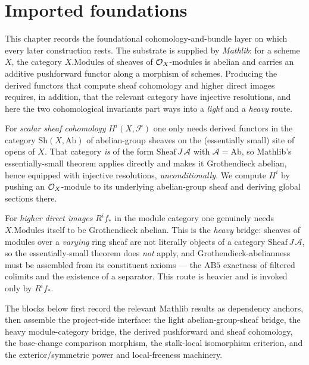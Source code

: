 \section{Imported foundations}


This chapter records the foundational cohomology-and-bundle layer on which every
later construction rests.  The substrate is supplied by \emph{Mathlib}: for a
scheme \(X\), the category \(X.\mathrm{Modules}\) of sheaves of
\(\mathcal{O}_X\)-modules is abelian and carries an additive pushforward functor along a
morphism of schemes.  Producing the derived functors that compute sheaf
cohomology and higher direct images requires, in addition, that the relevant
category have injective resolutions, and here the two cohomological invariants
part ways into a \emph{light} and a \emph{heavy} route.

For \emph{scalar sheaf cohomology} \(H^i(X,\mathcal F)\) one only needs derived
functors in the category \(\mathrm{Sh}(X,\mathrm{Ab})\) of abelian-group sheaves
on the (essentially small) site of opens of \(X\).  That category \emph{is} of
the form \(\mathrm{Sheaf}\,J\,\mathcal A\) with \(\mathcal A=\mathrm{Ab}\), so
Mathlib's essentially-small theorem applies directly and makes it Grothendieck
abelian, hence equipped with injective resolutions, \emph{unconditionally}.  We
compute \(H^i\) by pushing an \(\mathcal{O}_X\)-module to its underlying abelian-group
sheaf and deriving global sections there.

For \emph{higher direct images} \(R^if_*\) in the module category one genuinely
needs \(X.\mathrm{Modules}\) itself to be Grothendieck abelian.  This is the
\emph{heavy} bridge: sheaves of modules over a \emph{varying} ring sheaf are not
literally objects of a category \(\mathrm{Sheaf}\,J\,\mathcal A\), so the
essentially-small theorem does \emph{not} apply, and Grothendieck-abelianness
must be assembled from its constituent axioms --- the \(\mathrm{AB5}\) exactness
of filtered colimits and the existence of a separator.  This route is heavier
and is invoked only by \(R^if_*\).

The blocks below first record the relevant Mathlib results as dependency
anchors, then assemble the project-side interface: the light abelian-group-sheaf
bridge, the heavy module-category bridge, the derived pushforward and sheaf
cohomology, the base-change comparison morphism, the stalk-local isomorphism
criterion, and the exterior/symmetric power and local-freeness machinery.

